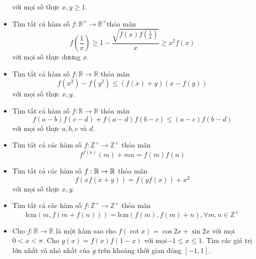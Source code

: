\documentclass[11pt]{scrartcl}
\begin{document}
\begin{itemize}[label=, leftmargin=0em, itemsep=-0em]
\begin{btvn}
        với mọi số thực $x, y \geq 1$.
    \end{btvn}
    \item \begin{btvn}
         Tìm tất cả hàm số $f: \mathbb{R}^{+} \rightarrow \mathbb{R}^{+}$thỏa mãn
        $$
        f\left(\frac{1}{x}\right) \geq 1-\frac{\sqrt{f(x) f\left(\frac{1}{x}\right)}}{x} \geq x^2 f(x)
        $$
        với mọi số thực dương $x$.
    \end{btvn}
    \item \begin{btvn}
        Tìm tất cả hàm số $f: \mathbb{R} \rightarrow \mathbb{R}$ thỏa mãn
        $$
        f\left(x^2\right)-f\left(y^2\right) \leq(f(x)+y)(x-f(y))
        $$
        với mọi số thực $x, y$.
    \end{btvn}
    \item \begin{btvn}
         Tìm tất cả hàm số $f: \mathbb{R} \rightarrow \mathbb{R}$ thỏa mãn
            $$
            f(a-b) f(c-d)+f(a-d) f(b-c) \leq(a-c) f(b-d)
            $$
            với mọi số thực $a, b, c$ và $d$.
    \end{btvn}
    \item \begin{btvn}
        Tìm tất cả các hàm số $f: \mathbb{Z}^+\rightarrow \mathbb{Z}^+$ thỏa mãn
        \[f^{f(n)}(m)+mn=f(m)f(n)\]
    \end{btvn}
    \item \begin{btvn}
        Tìm tất cả các hàm số $f: \mathbb{R} \to \mathbb{R}$ thỏa mãn 
        \[
            f(xf(x + y)) = f(yf(x)) + x^2
        \]
        với mọi số thực $x,y$.
    \end{btvn}
    \item \begin{btvn}
        Tìm tất cả các hàm số $f: \mathbb{Z}^+\rightarrow \mathbb{Z}^+$ thỏa mãn
        \[\text{lcm}(m, f(m+f(n)))=\text{lcm}(f(m), f(m)+n), \forall m,n \in \mathbb{Z}^+\]
    \end{btvn}
    \item \begin{btvn}
        Cho $f: \mathbb{R}\to\mathbb{R}$ là một hàm sao cho $f( \cot x ) = \cos 2x+\sin 2x$ với mọi $0 < x < \pi$. Cho $g(x) = f(x) f(1-x)$ với mọi$-1 \leq x \leq 1$. Tìm các giá trị lớn nhất và nhỏ nhất của $g$ trên khoảng thời gian đóng $[-1, 1].$

\end{btvn}
\end{itemize}
\end{document}
